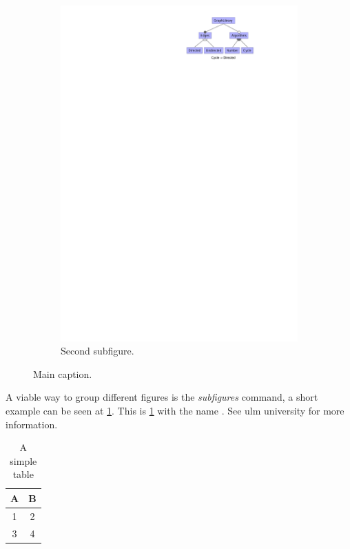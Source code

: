 \begin{figure}
\begin{subfigure}[c]{0.33\linewidth}
      \includegraphics[width=\linewidth]{img/example.pdf}
      \caption{Second subfigure.}
   \end{subfigure}
   \caption[Main]{Main caption.}
   \label{fig:main}
\end{figure}

A viable way to group different figures is the \textit{subfigures} command, a short example can be seen at \cref{fig:main}.
This is \cref{fig:main} with the name .
See ulm university for more information.

\begin{table}
   \caption{A simple table}
   \begin{tabular}{cc}
      \toprule
      A & B \\
      \midrule
      1 & 2 \\
      3 & 4 \\
      \bottomrule
   \end{tabular}
   \label{tab:simple}
\end{table}

